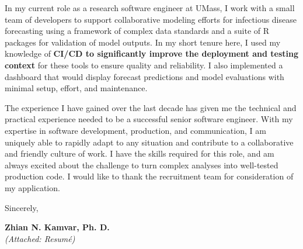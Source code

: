 \vspace{2ex}

In my current role as a research software engineer at UMass, I work with a
small team of developers to support collaborative modeling efforts for
infectious disease forecasting using a framework of complex data standards
and a suite of R packages for validation of model outputs. In my short tenure
here, I used my knowledge of \textbf{CI/CD to significantly improve the
deployment and testing context} for these tools to ensure quality and
reliability. I also implemented a dashboard that would display forecast
predictions and model evaluations with minimal setup, effort, and maintenance. 

\vspace{2ex}

The experience I have gained over the last decade has given me the technical
and practical experience needed to be a successful senior software engineer.
With my expertise in software development, production, and communication, I am
uniquely able to rapidly adapt to any situation and contribute to a
collaborative and friendly culture of work. I have the skills required for this
role, and am always excited about the challenge to turn complex analyses into
well-tested production code. I would like to thank the recruitment team for
consideration of my application.

\vspace{3ex}

Sincerely,

\vspace{4ex}

\textbf{Zhian N. Kamvar, Ph. D.}\\
{\footnotesize \textit{(Attached: Resum\'{e})}}

\clearpage



